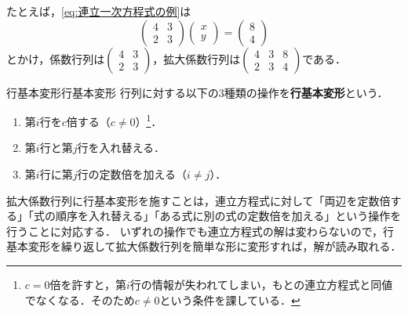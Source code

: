 たとえば，\eqref{eq:連立一次方程式の例}は
\[
  \begin{pmatrix} 4 & 3 \\ 2 & 3 \end{pmatrix}
  \begin{pmatrix} x \\ y \end{pmatrix}
  =
  \begin{pmatrix} 8 \\ 4 \end{pmatrix}
\]
とかけ，係数行列は$\begin{pmatrix} 4 & 3 \\ 2 & 3 \end{pmatrix}$，拡大係数行列は$\begin{pmatrix} 4 & 3 & 8 \\ 2 & 3 & 4 \end{pmatrix}$である．

\begin{definition}{行基本変形}{行基本変形}
  行列に対する以下の$3$種類の操作を\textbf{行基本変形}という．
  \begin{enumerate}[label=(\arabic*),leftmargin=3.2em]
    \item 第$i$行を$c$倍する（$c \ne 0$）\footnote{$c = 0$倍を許すと，第$i$行の情報が失われてしまい，もとの連立方程式と同値でなくなる．そのため$c \ne 0$という条件を課している．}．
    \item 第$i$行と第$j$行を入れ替える．
    \item 第$i$行に第$j$行の定数倍を加える（$i \ne j$）．
  \end{enumerate}
\end{definition}

拡大係数行列に行基本変形を施すことは，連立方程式に対して「両辺を定数倍する」「式の順序を入れ替える」「ある式に別の式の定数倍を加える」という操作を行うことに対応する．
いずれの操作でも連立方程式の解は変わらないので，行基本変形を繰り返して拡大係数行列を簡単な形に変形すれば，解が読み取れる．

